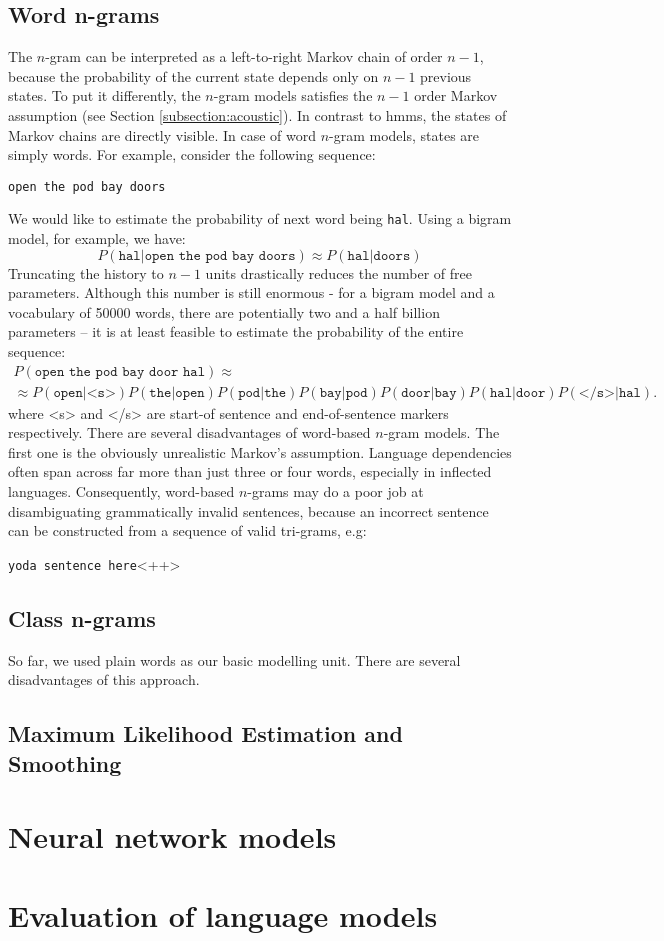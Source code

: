 \subsection{Word n-grams}
The $n$-gram can be interpreted as a left-to-right Markov chain of order $n-1$, because the probability of the current state depends only on $n-1$ previous states. To put it differently, the $n$-gram models satisfies the $n-1$ order Markov assumption (see Section \ref{subsection:acoustic}). In contrast to \glspl{hmm}, the states of Markov chains are directly visible. In case of word $n$-gram models, states are simply words. For example, consider the following sequence:
\begin{center}
\texttt{open the pod bay doors}  
\end{center}
We would like to estimate the probability of next word being \texttt{hal}. Using a bigram model, for example, we have:
\begin{equation}
	P(\texttt{hal}|\texttt{open the pod bay doors}) \approx P(\texttt{hal}|\texttt{doors})
\end{equation}
Truncating the history to $n-1$ units drastically reduces the number of free parameters. Although this number is still enormous - for a bigram model and a vocabulary of 50000 words, there are potentially two and a half billion parameters -- it is at least feasible to estimate the probability of the entire sequence:
\begin{multline}
	P(\texttt{open the pod bay door hal}) \approx \\
	\approx P(\texttt{open}|\texttt{<s>})P(\texttt{the}|\texttt{open})P(\texttt{pod}|\texttt{the})P(\texttt{bay}|\texttt{pod})P(\texttt{door}|\texttt{bay})P(\texttt{hal}|\texttt{door})P(\texttt{</s>}|\texttt{hal}).
\end{multline}
where <s> and </s> are start-of sentence and end-of-sentence markers respectively.
There are several disadvantages of word-based $n$-gram models. The first one is the obviously unrealistic Markov's assumption. Language dependencies often span across far more than just three or four words, especially in inflected languages. Consequently, word-based $n$-grams may do a poor job at disambiguating grammatically invalid sentences, because an incorrect sentence can be constructed from a sequence of valid tri-grams, e.g:
\begin{centering}
	\texttt{yoda sentence here}<++>
\end{centering}
\subsection{Class n-grams}
\label{subsection:class}
So far, we used plain words as our basic modelling unit. There are several disadvantages of this approach.
\subsection{Maximum Likelihood Estimation and Smoothing}

\section{Neural network models}
\label{section:ann}
\section{Evaluation of language models}
\label{section:evaluation}


